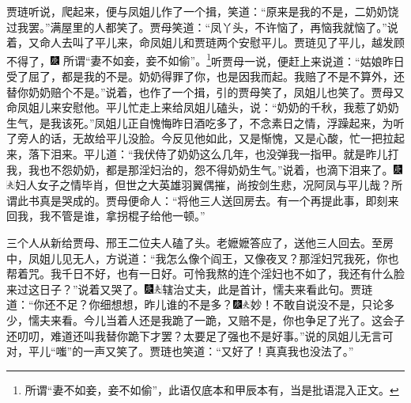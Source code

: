 贾琏听说，爬起来，便与凤姐儿作了一个揖，笑道：“原来是我的不是，二奶奶饶过我罢。”满屋里的人都笑了。贾母笑道：“凤丫头，不许恼了，再恼我就恼了。”说着，又命人去叫了平儿来，命凤姐儿和贾琏两个安慰平儿。贾琏见了平儿，越发顾不得了，{\includegraphics[width=3mm]{../Images/00004}  \kaishu 所谓“妻不如妾，妾不如偷”。}\footnote{所谓“妻不如妾，妾不如偷”，此语仅底本和甲辰本有，当是批语混入正文。}听贾母一说，便赶上来说道：“姑娘昨日受了屈了，都是我的不是。奶奶得罪了你，也是因我而起。我赔了不是不算外，还替你奶奶赔个不是。”说着，也作了一个揖，引的贾母笑了，凤姐儿也笑了。贾母又命凤姐儿来安慰他。平儿忙走上来给凤姐儿磕头，说：“奶奶的千秋，我惹了奶奶生气，是我该死。”凤姐儿正自愧悔昨日酒吃多了，不念素日之情，浮躁起来，为听了旁人的话，无故给平儿没脸。今反见他如此，又是惭愧，又是心酸，忙一把拉起来，落下泪来。平儿道：“我伏侍了奶奶这么几年，也没弹我一指甲。就是昨儿打我，我也不怨奶奶，都是那淫妇治的，怨不得奶奶生气。”说着，也滴下泪来了。{\includegraphics[width=3mm]{../Images/00004}\includegraphics[width=3mm]{../Images/00012}\footnotesize \kaishu 妇人女子之情毕肖，但世之大英雄羽翼偶摧，尚按剑生悲，况阿凤与平儿哉？所谓此书真是哭成的。}贾母便命人：“将他三人送回房去。有一个再提此事，即刻来回我，我不管是谁，拿拐棍子给他一顿。”

三个人从新给贾母、邢王二位夫人磕了头。老嬷嬷答应了，送他三人回去。至房中，凤姐儿见无人，方说道：“我怎么像个阎王，又像夜叉？那淫妇咒我死，你也帮着咒。我千日不好，也有一日好。可怜我熬的连个淫妇也不如了，我还有什么脸来过这日子？”说着又哭了。{\includegraphics[width=3mm]{../Images/00004}\includegraphics[width=3mm]{../Images/00012}\footnotesize \kaishu 辖治丈夫，此是首计，懦夫来看此句。}贾琏道：“你还不足？你细想想，昨儿谁的不是多？{\includegraphics[width=3mm]{../Images/00004}\includegraphics[width=3mm]{../Images/00012}\footnotesize \kaishu 妙！不敢自说没不是，只论多少，懦夫来看。}今儿当着人还是我跪了一跪，又赔不是，你也争足了光了。这会子还叨叨，难道还叫我替你跪下才罢？太要足了强也不是好事。”说的凤姐儿无言可对，平儿“嗤”的一声又笑了。贾琏也笑道：“又好了！真真我也没法了。”

